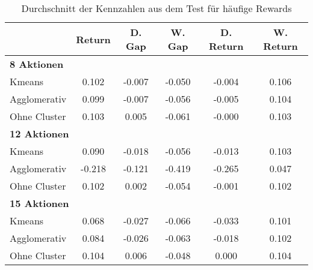 \begin{table}[ht]
\centering
\caption{Durchschnitt der Kennzahlen aus dem Test für häufige Rewards}
\begin{tabular}{lccccc}
\hline
\textbf{} & \textbf{Return} & \textbf{D. Gap} & \textbf{W. Gap} & \textbf{D. Return} & \textbf{W. Return} \\
\hline
\multicolumn{6}{l}{\textbf{8 Aktionen}} \\
\hspace{1em}Kmeans & 0.102 & -0.007 & -0.050 & -0.004 & 0.106 \\
\hspace{1em}Agglomerativ & 0.099 & -0.007 & -0.056 & -0.005 & 0.104 \\
\hspace{1em}Ohne Cluster & 0.103 & 0.005 & -0.061 & -0.000 & 0.103 \\
\hline
\multicolumn{6}{l}{\textbf{12 Aktionen}} \\
\hspace{1em}Kmeans & 0.090 & -0.018 & -0.056 & -0.013 & 0.103 \\
\hspace{1em}Agglomerativ & -0.218 & -0.121 & -0.419 & -0.265 & 0.047 \\
\hspace{1em}Ohne Cluster & 0.102 & 0.002 & -0.054 & -0.001 & 0.102 \\
\hline
\multicolumn{6}{l}{\textbf{15 Aktionen}} \\
\hspace{1em}Kmeans & 0.068 & -0.027 & -0.066 & -0.033 & 0.101 \\
\hspace{1em}Agglomerativ & 0.084 & -0.026 & -0.063 & -0.018 & 0.102 \\
\hspace{1em}Ohne Cluster & 0.104 & 0.006 & -0.048 & 0.000 & 0.104 \\
\hline
\end{tabular}
\end{table}


